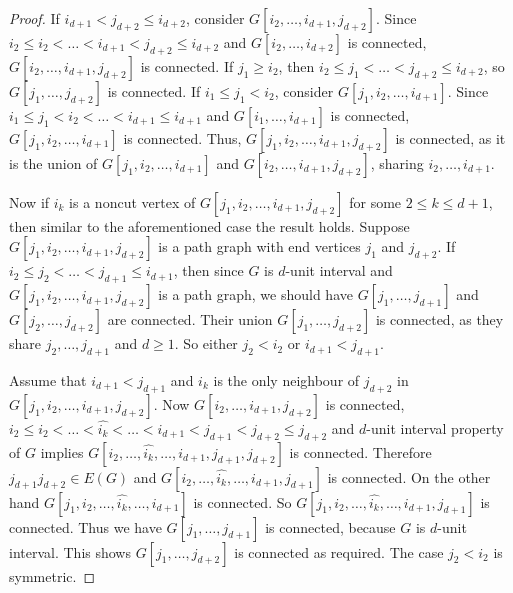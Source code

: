 \documentclass[10pt,a4paper]{amsart}
\begin{document}
\begin{proof}
If $i_{d+1} < j_{d+2} \leq i_{d+2}$, consider $G[i_2, \dots, i_{d+1}, j_{d+2}]$. Since $i_2 \leq i_2 < \dots < i_{d+1} < j_{d+2} \leq i_{d+2}$ and $G[i_2, \dots, i_{d+2}]$ is connected, $G[i_2, \dots, i_{d+1}, j_{d+2}]$ is connected. If $j_1 \geq i_2$, then $i_2 \leq j_1 < \dots < j_{d+2} \leq i_{d+2}$, so $G[j_1, \dots, j_{d+2}]$ is connected. If $i_1 \leq j_1 < i_2$, consider $G[j_1, i_2, \dots, i_{d+1}]$. Since $i_1 \leq j_1 < i_2 < \dots < i_{d+1} \leq i_{d+1}$ and $G[i_1, \dots, i_{d+1}]$ is connected, $G[j_1, i_2, \dots, i_{d+1}]$ is connected. Thus, $G[j_1, i_2, \dots, i_{d+1}, j_{d+2}]$ is connected, as it is the union of $G[j_1, i_2, \dots, i_{d+1}]$ and $G[i_2, \dots, i_{d+1}, j_{d+2}]$, sharing $i_2, \dots, i_{d+1}$.

Now if  $i_k$ is a noncut vertex of $G[j_1, i_2 , \dots , i_{d+1}, j_{d+2}]$ for some $2\leq k \leq d+1$, then similar to the aforementioned case the result holds. Suppose $G[j_1, i_2 , \dots , i_{d+1}, j_{d+2}]$ is a path graph with end vertices $j_1$ and $j_{d+2}$. If $i_2\leq j_2<\dots <j_{d+1} \leq i_{d+1}$, then since $G$ is $d$-unit interval and $G[j_1, i_2 , \dots , i_{d+1}, j_{d+2}]$ is a path graph, we should have $G[j_1, \dots , j_{d+1}]$ and $G[j_2, \dots , j_{d+2}]$ are connected. Their union $G[j_1, \dots, j_{d+2}]$ is connected, as they share $j_2, \dots, j_{d+1}$ and $d \geq 1$. So either $j_2<i_2$ or $i_{d+1}<j_{d+1}$.

Assume that $i_{d+1}<j_{d+1}$ and $i_k$ is the only neighbour of $j_{d+2}$ in $G[j_1, i_2 , \dots , i_{d+1}, j_{d+2}]$. Now $G[i_2, \dots , i_{d+1}, j_{d+2}]$ is connected, $i_2\leq i_2< \dots <\widehat{i_k} < \dots < i_{d+1}<j_{d+1}<j_{d+2}\leq j_{d+2}$ and $d$-unit interval property of $G$ implies $G[ i_2, \dots , \widehat{i_k}, \dots , i_{d+1},j_{d+1},j_{d+2}]$ is connected.  Therefore  $j_{d+1}j_{d+2}\in E(G)$ and $G[ i_2, \dots , \widehat{i_k}, \dots , i_{d+1},j_{d+1}]$ is connected. On the other hand  $G[j_1, i_2, \dots , \widehat{i_k}, \dots , i_{d+1}]$ is connected. So $G[j_1, i_2, \dots , \widehat{i_k}, \dots , i_{d+1},j_{d+1}]$ is  connected. Thus  we have  $G[j_1, \dots , j_{d+1}]$ is connected, because $G$ is $d$-unit interval. This shows $G[j_1, \dots , j_{d+2}]$ is connected as required. The case $j_2<i_2$ is
symmetric.
\end{proof}
\end{document}
